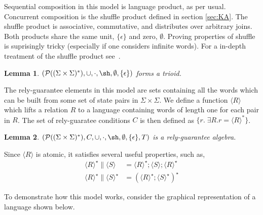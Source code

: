 \documentclass{llncs}
\DeclareMathOperator{\sha}{\sh}
\newtheorem{lem}{Lemma}
\begin{document}
Sequential composition in this model is language product, as per
usual. Concurrent composition is the shuffle product defined in
section \ref{sec:KA}. The shuffle product is associative, commutative,
and distributes over arbitrary joins. Both products share the same
unit, $\{\epsilon\}$ and zero, $\emptyset$. Proving properties of
shuffle is suprisingly tricky (especially if one considers infinite
words). For a in-depth treatment of the shuffle product
see~\cite{mateescu_shuffle-like_1997}.

\begin{lem}
$(\mathcal{P}((\Sigma\times\Sigma)^*), \cup, \cdot,\sha, \emptyset,
  \{\epsilon\})$ forms a trioid.
\end{lem}

The rely-guarantee elements in this model are sets containing all the
words which can be built from some set of state pairs in
$\Sigma\times\Sigma$. We define a function $\langle R\rangle$ which
lifts a relation $R$ to a language containing words of length one for
each pair in $R$. The set of rely-guaratee conditions $C$ is then defined
as $\{r.\; \exists R. r = \langle R\rangle^*\}$.

\begin{lem}
$(\mathcal{P}((\Sigma\times\Sigma)^*), C, \cup, \cdot,\sha,
  \emptyset, \{\epsilon\}, T)$ is a rely-guarantee algebra.
\end{lem}
Since $\langle R\rangle$ is atomic, it satisfies several useful properties, such as,
\begin{align*}
\langle R\rangle^\star \| \langle S\rangle &= \langle R\rangle^\star; \langle S\rangle; \langle R\rangle^\star\\
\langle R\rangle^\star \| \langle S\rangle^\star &= (\langle R\rangle^\star; \langle S\rangle^\star)^\star
\end{align*}

To demonstrate how this model works, consider the graphical
representation of a language shown below.
\end{document}
